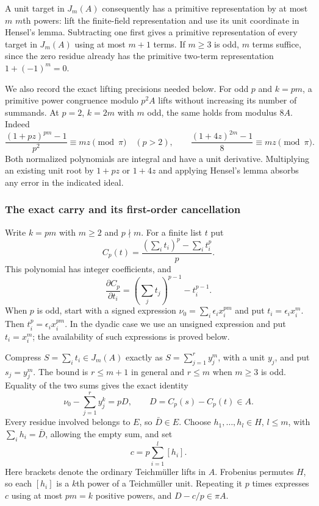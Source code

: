 \documentclass[11pt]{amsart}
\theoremstyle{definition}
\numberwithin{equation}{section}
\begin{document}
A unit target in $J_m(A)$ consequently has a primitive representation
by at most $m$ $m$th powers: lift the finite-field representation
and use its unit coordinate in Hensel's lemma. Subtracting one first
gives a primitive representation of every target in $J_m(A)$ using
at most $m+1$ terms. If $m\ge3$ is odd, $m$ terms suffice, since
the zero residue already has the primitive two-term representation
$1+(-1)^m=0$.

We also record the exact lifting precisions needed below. For odd
$p$ and $k=pm$, a primitive power congruence modulo $p^2A$ lifts
without increasing its number of summands. At $p=2$, $k=2m$ with
$m$ odd, the same holds from modulus $8A$. Indeed
\begin{equation}\label{eq:carry-primitive-lifts}
 \frac{(1+pz)^{pm}-1}{p^2}\equiv mz\pmod\pi
 \quad(p>2),\qquad
 \frac{(1+4z)^{2m}-1}{8}\equiv mz\pmod\pi.
\end{equation}
Both normalized polynomials are integral and have a unit derivative.
Multiplying an existing unit root by $1+pz$ or $1+4z$ and applying
Hensel's lemma absorbs any error in the indicated ideal.

\subsubsection{The exact carry and its first-order cancellation}

Write $k=pm$ with $m\ge2$ and $p\nmid m$. For a finite list $t$ put
\[
 C_p(t)=\frac{(\sum_i t_i)^p-\sum_i t_i^p}{p}.
\]
This polynomial has integer coefficients, and
\begin{equation}\label{eq:carry-derivative}
 \frac{\partial C_p}{\partial t_i}
       =(\sum_jt_j)^{p-1}-t_i^{p-1}.
\end{equation}
When $p$ is odd, start with a signed expression
$\nu_0=\sum_i\epsilon_i x_i^{pm}$ and put $t_i=\epsilon_i x_i^m$.
Then $t_i^p=\epsilon_i x_i^{pm}$. In the dyadic case we use an
unsigned expression and put $t_i=x_i^m$; the availability of such
expressions is proved below.

Compress $S=\sum_i t_i\in J_m(A)$ exactly as
$S=\sum_{j=1}^r y_j^m$, with a unit $y_j$, and put $s_j=y_j^m$.
The bound is $r\le m+1$ in general and $r\le m$ when $m\ge3$ is odd.
Equality of the two sums gives the exact identity
\begin{equation}\label{eq:carry-exact}
 \nu_0-\sum_{j=1}^r y_j^k=pD,
 \qquad D=C_p(s)-C_p(t)\in A.
\end{equation}
Every residue involved belongs to $E$, so $\bar D\in E$.
Choose $h_1,\ldots,h_l\in H$, $l\le m$, with
$\sum_i h_i=\bar D$, allowing the empty sum, and set
\begin{equation}\label{eq:carry-constant}
 c=p\sum_{i=1}^l[h_i].
\end{equation}
Here brackets denote the ordinary Teichm\"uller lifts in $A$.
Frobenius permutes $H$, so each $[h_i]$ is a $k$th power of a
Teichm\"uller unit. Repeating it $p$ times expresses $c$ using at
most $pm=k$ positive powers, and $D-c/p\in\pi A$.
\end{document}
